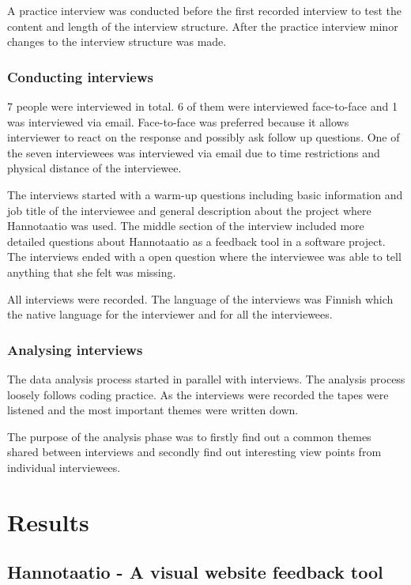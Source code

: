 \documentclass[english,12pt,a4paper,pdftex]{article}
\begin{document}
A practice interview was conducted before the first recorded interview to test the content and length of the interview structure. After the practice interview minor changes to the interview structure was made.

\subsubsection{Conducting interviews}

7 people were interviewed in total. 6 of them were interviewed face-to-face and 1 was interviewed via email. Face-to-face was preferred because it allows interviewer to react on the response and possibly ask follow up questions. One of the seven interviewees was interviewed via email due to time restrictions and physical distance of the interviewee.

The interviews started with a warm-up questions including basic information and job title of the interviewee and general description about the project where Hannotaatio was used. The middle section of the interview included more detailed questions about Hannotaatio as a feedback tool in a software project. The interviews ended with a open question where the interviewee was able to tell anything that she felt was missing.

All interviews were recorded. The language of the interviews was Finnish which the native language for the interviewer and for all the interviewees.

\subsubsection{Analysing interviews}

The data analysis process started in parallel with interviews. The analysis process loosely follows coding practice. As the interviews were recorded the tapes were listened and the most important themes were written down. 

The purpose of the analysis phase was to firstly find out a common themes shared between interviews and secondly find out interesting view points from individual interviewees.

\clearpage

\section{Results}

\subsection{Hannotaatio - A visual website feedback tool}
\end{document}
